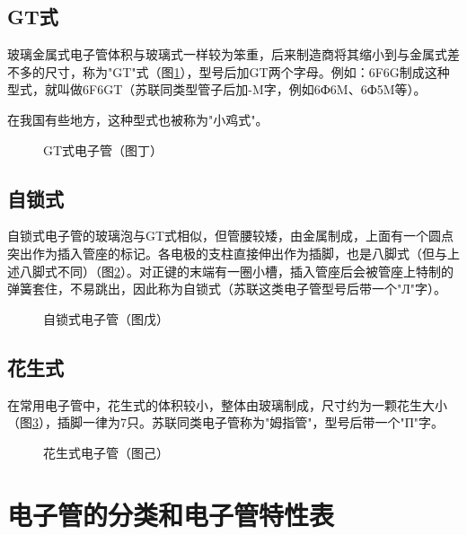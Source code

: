 \documentclass[12pt,UTF8]{ctexbook}
\begin{document}
\subsection{GT式}

玻璃金属式电子管体积与玻璃式一样较为笨重，后来制造商将其缩小到与金属式差不多的尺寸，称为"GT"式（图\ref{fig:gt_tube}），型号后加GT两个字母。例如：6F6G制成这种型式，就叫做6F6GT（苏联同类型管子后加-M字，例如6Ф6M、6Ф5M等）。

在我国有些地方，这种型式也被称为"小鸡式"。

\begin{figure}[htbp]
    \centering
    \caption{GT式电子管（图丁）}
    \label{fig:gt_tube}
\end{figure}

\subsection{自锁式}

自锁式电子管的玻璃泡与GT式相似，但管腰较矮，由金属制成，上面有一个圆点突出作为插入管座的标记。各电极的支柱直接伸出作为插脚，也是八脚式（但与上述八脚式不同）（图\ref{fig:self_locking_tube}）。对正键的末端有一圈小槽，插入管座后会被管座上特制的弹簧套住，不易跳出，因此称为自锁式（苏联这类电子管型号后带一个"Л"字）。

\begin{figure}[htbp]
    \centering
    \caption{自锁式电子管（图戊）}
    \label{fig:self_locking_tube}
\end{figure}

\subsection{花生式}

在常用电子管中，花生式的体积较小，整体由玻璃制成，尺寸约为一颗花生大小（图\ref{fig:peanut_tube}），插脚一律为7只。苏联同类电子管称为"姆指管"，型号后带一个"П"字。

\begin{figure}[htbp]
    \centering
    \caption{花生式电子管（图己）}
    \label{fig:peanut_tube}
\end{figure}

\section{电子管的分类和电子管特性表}
\end{document}
